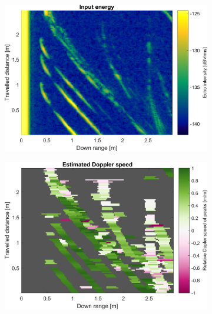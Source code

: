 \begin{figure}[htbp]
    \centering
    \begin{subfigure}[t]{0.475\linewidth}
        \centering
        \includegraphics[width=\linewidth,max height=.475\textheight]{gfx/results/falloutshelter_input.png}
    \end{subfigure}%
    \hfill%
    \begin{subfigure}[t]{0.475\linewidth}
        \centering
        \includegraphics[width=\linewidth,max height=.475\textheight]{gfx/results/falloutshelter_doppler.png}
    \end{subfigure}\bigskip\\
    \begin{subfigure}[t]{0.5\linewidth}
        \centering

\end{subfigure}
\end{figure}
